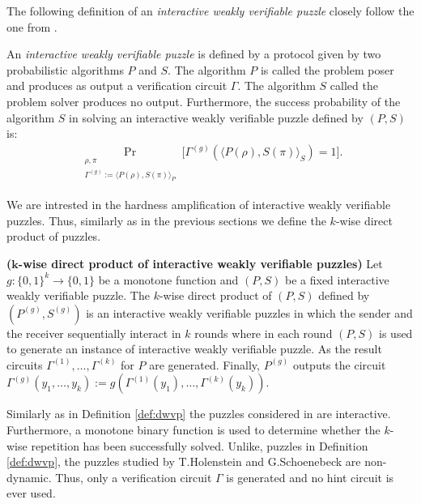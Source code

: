 The following definition of an \textit{interactive weakly verifiable puzzle} closely follow the one from \cite{DBLP:journals/corr/abs-1002-3534}.
\begin{definition}
An \textit{interactive weakly verifiable puzzle} is defined by a protocol given by two probabilistic algorithms $P$ and $S$.
The algorithm $P$ is called the problem poser and produces as output a verification circuit $\Gamma$.
The algorithm $S$ called the problem solver produces no output.
Furthermore, the \textnormal{success probability} of the algorithm $S$ in solving an interactive weakly verifiable puzzle defined by $(P,S)$ is:
\begin{align*}
  \underset{\substack{\rho, \pi \\ \Gamma^{(g)} := \langle P(\rho), S(\pi) \rangle_{P}}}{\Pr}\Big[\Gamma^{(g)}(\langle P(\rho),S(\pi) \rangle_{S}) = 1 \Big].
\end{align*}
\end{definition}
We are intrested in the hardness amplification of interactive weakly verifiable puzzles. Thus, similarly as in the previous sections
we define the $k$-wise direct product of puzzles.
\begin{definition}\textbf{($\boldsymbol{k}$-wise direct product of interactive weakly verifiable puzzles)}
Let $g: \{0,1\}^{k} \rightarrow \{0,1\}$ be a monotone function and $(P,S)$ be a fixed interactive weakly verifiable puzzle.
The $k$-wise direct product of $(P,S)$ defined by $(P^{(g)}, S^{(g)})$ is an interactive weakly verifiable puzzles in which the sender and the receiver
sequentially interact in $k$ rounds where in each round $(P,S)$ is used to generate an instance of interactive weakly verifiable puzzle.
As the result circuits $\Gamma^{(1)}, \dotsc, \Gamma^{(k)}$ for $P$ are generated.
Finally, $P^{(g)}$ outputs the circuit $\Gamma^{(g)}(y_1, \dotsc, y_k) := g(\Gamma^{(1)}(y_1), \dotsc, \Gamma^{(k)}(y_k))$.
\end{definition}

Similarly as in Definition \ref{def:dwvp} the puzzles considered in \cite{DBLP:journals/corr/abs-1002-3534} are interactive.
Furthermore, a monotone binary function is used to determine whether the $k$-wise repetition
has been successfully solved. Unlike, puzzles in Definition \ref{def:dwvp}, the puzzles studied by T.Holenstein and G.Schoenebeck
are non-dynamic. Thus, only a verification circuit $\Gamma$ is generated and no hint circuit is ever used.


